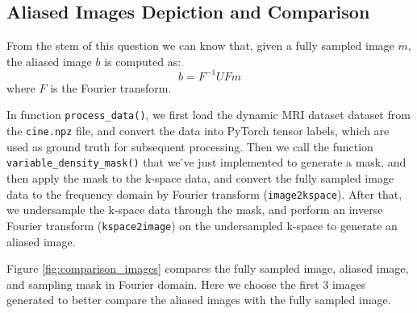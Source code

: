 \documentclass{article}
\begin{document}
\subsection{Aliased Images Depiction and Comparison}
From the stem of this question we can know that, given a fully sampled image $m$,
the aliased image $b$ is computed as:
\begin{equation}
  b = F^{-1} U F m
\end{equation}
where $F$ is the Fourier transform.

In function \texttt{process\_data()}, we first load the dynamic MRI dataset dataset from the \texttt{cine.npz} file,
and convert the data into PyTorch tensor labels, which are used as ground truth for subsequent processing. Then we
call the function \texttt{variable\_density\_mask()} that we've just implemented to generate a mask,
and then apply the mask to the k-space data, and convert the fully sampled image data to the frequency
domain by Fourier transform (\texttt{image2kspace}). After that, we undersample the k-space data through the mask,
and perform an inverse Fourier transform (\texttt{kspace2image}) on the undersampled k-space to generate an aliased image.

Figure \ref{fig:comparison_images} compares the fully sampled image, aliased image, and sampling mask in Fourier domain.
Here we choose the first 3 images generated to better compare the aliased images with the fully sampled image.
\end{document}
